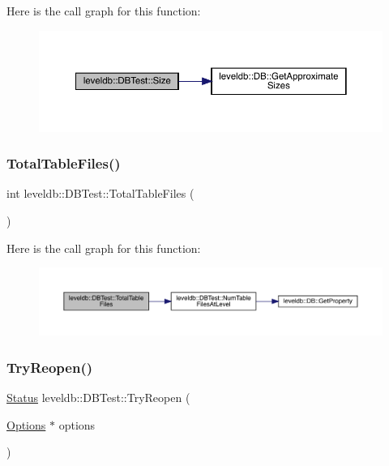 Here is the call graph for this function\+:
\nopagebreak
\begin{figure}[H]
\begin{center}
\leavevmode
\includegraphics[width=350pt]{classleveldb_1_1_d_b_test_a2b16106ccbd302127b5c0575e74e6be1_cgraph}
\end{center}
\end{figure}
\mbox{\label{classleveldb_1_1_d_b_test_a05fa745351a41ecc0165b391a605b79e}} 
\subsubsection{\texorpdfstring{TotalTableFiles()}{TotalTableFiles()}}
{\footnotesize\ttfamily int leveldb\+::\+D\+B\+Test\+::\+Total\+Table\+Files (\begin{DoxyParamCaption}{ }\end{DoxyParamCaption})\hspace{0.3cm}{\ttfamily [inline]}}

Here is the call graph for this function\+:
\nopagebreak
\begin{figure}[H]
\begin{center}
\leavevmode
\includegraphics[width=350pt]{classleveldb_1_1_d_b_test_a05fa745351a41ecc0165b391a605b79e_cgraph}
\end{center}
\end{figure}
\mbox{\label{classleveldb_1_1_d_b_test_aee588b2d13db6be2a651a8fabeac5c79}} 
\subsubsection{\texorpdfstring{TryReopen()}{TryReopen()}}
{\footnotesize\ttfamily \mbox{\hyperlink{classleveldb_1_1_status}{Status}} leveldb\+::\+D\+B\+Test\+::\+Try\+Reopen (\begin{DoxyParamCaption}\item[{\mbox{\hyperlink{structleveldb_1_1_options}{Options}} $\ast$}]{options }\end{DoxyParamCaption})\hspace{0.3cm}{\ttfamily [inline]}}

